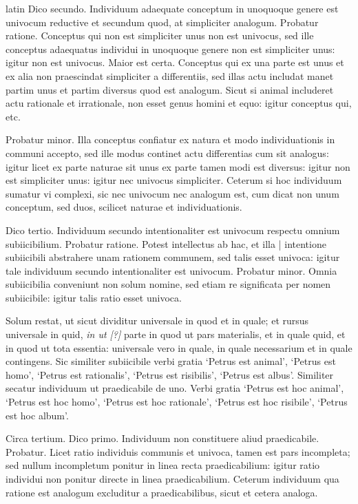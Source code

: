 \begin{otherlanguage*}{latin}
\pstart
Dico secundo. Individuum adaequate conceptum in unoquoque genere est univocum reductive et secundum quod, at simpliciter analogum. Probatur ratione. Conceptus qui non est simpliciter unus non est univocus, sed ille conceptus adaequatus individui in unoquoque genere non est simpliciter unus:
igitur non est univocus. Maior est certa. Conceptus qui ex una parte est unus et ex alia non praescindat simpliciter a differentiis, sed illas actu includat manet partim unus et partim diversus quod est analogum. Sicut si animal includeret actu rationale et irrationale, non esset genus homini et equo:
igitur conceptus qui, etc. 
\pend

\pstart
Probatur minor. Illa conceptus confiatur ex natura et modo individuationis in communi accepto, sed ille modus continet actu differentias cum sit analogus:
igitur licet ex parte naturae sit unus ex parte tamen modi est diversus:
igitur non est simpliciter unus:
igitur nec univocus simpliciter. Ceterum si hoc individuum sumatur vi complexi, sic nec univocum nec analogum est, cum dicat non unum conceptum, sed duos, scilicet naturae et individuationis. 
\pend

\pstart
Dico tertio. Individuum secundo intentionaliter est univocum respectu omnium subiicibilium. Probatur ratione. Potest intellectus ab hac, et illa  \textnormal{|} intentione subiicibili abstrahere unam rationem communem, sed talis esset univoca:
igitur tale individuum secundo intentionaliter est univocum. Probatur minor. Omnia subiicibilia conveniunt non solum nomine, sed etiam re significata per nomen subiicibile:
igitur talis ratio esset univoca. 
\pend

\pstart
Solum restat, ut sicut dividitur universale in quod et in quale; et rursus universale in quid, \emph{in ut [?]} parte in quod ut pars materialis, et in quale quid, et in quod ut tota essentia:
universale vero in quale, in quale necessarium et in quale contingens. Sic similiter subiicibile verbi gratia `Petrus est animal', `Petrus est homo', `Petrus est rationalis', `Petrus est risibilis', `Petrus est albus'. Similiter secatur individuum ut praedicabile de uno. Verbi gratia `Petrus est hoc animal', `Petrus est hoc homo', `Petrus est hoc rationale', `Petrus est hoc risibile', `Petrus est hoc album'. 
\pend

\pstart
Circa tertium. Dico primo. Individuum non constituere aliud praedicabile. Probatur. Licet ratio individuis communis et univoca, tamen est pars incompleta; sed nullum incompletum ponitur in linea recta praedicabilium:
igitur ratio individui non ponitur directe in linea praedicabilium. Ceterum individuum qua ratione est analogum excluditur a praedicabilibus, sicut et cetera analoga. 
\pend


\end{otherlanguage*}
